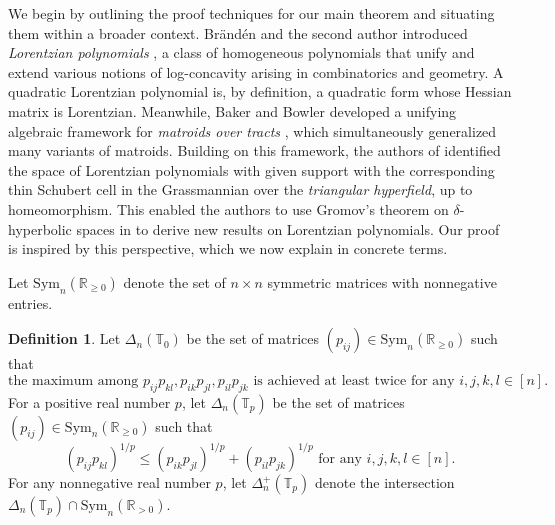 \documentclass{amsart}
\theoremstyle{definition}
\newtheorem{definition}[theorem]{Definition}
\theoremstyle{remark}
\def\RR{\mathbb{R}}
\def\T{\mathbb{T}}
\def\Sym{\mathrm{Sym}}
\begin{document}
We begin by outlining the proof techniques for our main theorem and situating them within a broader context. Br\"and\'en and the second author introduced \emph{Lorentzian polynomials} \cite{Branden-Huh}, a class of homogeneous polynomials that unify and extend various notions of log-concavity arising in combinatorics and geometry. A quadratic Lorentzian polynomial is, by definition, a quadratic form whose Hessian matrix is Lorentzian. 
 Meanwhile, Baker and Bowler developed a unifying algebraic framework for \emph{matroids over tracts} \cite{Baker-Bowler}, which simultaneously generalized many variants of matroids. Building on this framework, the authors of  \cite{BHKL-triangular} identified the space of Lorentzian polynomials with given support with the corresponding thin Schubert cell in the Grassmannian over the \emph{triangular hyperfield}, up to homeomorphism. This enabled the authors to use Gromov's theorem on $\delta$-hyperbolic spaces in \cite{BHKL-triangular2} to derive new results on Lorentzian polynomials. Our proof is inspired by this perspective, which we now explain in concrete terms.

 Let $\Sym_n(\RR_{ \ge 0})$ denote the set of $n \times n$ symmetric matrices with nonnegative entries.
 
\begin{definition}
Let $\Delta_n(\T_0)$ be the set of matrices $(p_{ij}) \in \Sym_n(\RR_{ \ge 0})$ such that
\[
\text{the maximum among $p_{ij}p_{kl}, p_{ik}p_{jl}, p_{il}p_{jk}$ is achieved at least twice for any $i,j,k,l \in [n]$.}
\]
For a positive real number $p$, let $\Delta_n(\T_p)$ be the set of matrices $(p_{ij}) \in \Sym_n(\RR_{ \ge 0})$ such that
\[
\text{
$(p_{ij}p_{kl})^{1/p} \le
 (p_{ik}p_{jl})^{1/p}+
(p_{il}p_{jk})^{1/p}$  for any $i,j,k,l \in [n]$.}
\]
For any nonnegative real number $p$, let $\Delta^+_n(\T_p)$ denote the intersection $\Delta_n(\T_p) \cap \Sym_n(\RR_{> 0})$.
\end{definition}



\end{document}
